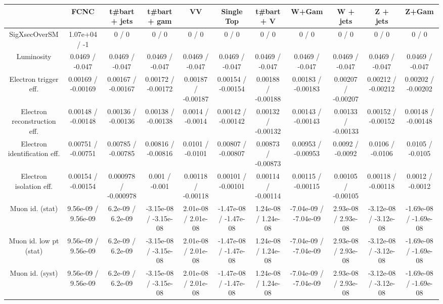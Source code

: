 \begin{table}[htbp]
\begin{center}
\footnotesize
\begin{tabular}{|c|c|c|c|c|c|c|c|c|c|c|}
\hline 
      & FCNC      & t#bar{t} + jets      & t#bar{t} +  gam      & VV      & Single Top      & t#bar{t} + V      & W+Gam      & W + jets      & Z + jets      & Z+Gam \\ 
\hline 
 SigXsecOverSM & 1.07e+04 / -1 & 0 / 0 & 0 / 0 & 0 / 0 & 0 / 0 & 0 / 0 & 0 / 0 & 0 / 0 & 0 / 0 & 0 / 0 \\ 
  Luminosity & 0.0469 / -0.047 & 0.0469 / -0.047 & 0.0469 / -0.047 & 0.0469 / -0.047 & 0.0469 / -0.047 & 0.0469 / -0.047 & 0.0469 / -0.047 & 0.0469 / -0.047 & 0.0469 / -0.047 & 0.0469 / -0.047 \\ 
  Electron trigger eff. & 0.00169 / -0.00169 & 0.00167 / -0.00167 & 0.00172 / -0.00172 & 0.00187 / -0.00187 & 0.00154 / -0.00154 & 0.00188 / -0.00188 & 0.00183 / -0.00183 & 0.00207 / -0.00207 & 0.00212 / -0.00212 & 0.00202 / -0.00202 \\ 
  Electron reconstruction eff. & 0.00148 / -0.00148 & 0.00136 / -0.00136 & 0.00138 / -0.00138 & 0.0014 / -0.0014 & 0.00142 / -0.00142 & 0.00132 / -0.00132 & 0.00143 / -0.00143 & 0.00133 / -0.00133 & 0.00152 / -0.00152 & 0.00148 / -0.00148 \\ 
  Electron identification eff. & 0.00751 / -0.00751 & 0.00785 / -0.00785 & 0.00816 / -0.00816 & 0.0101 / -0.0101 & 0.00807 / -0.00807 & 0.00873 / -0.00873 & 0.00953 / -0.00953 & 0.0092 / -0.0092 & 0.0106 / -0.0106 & 0.0105 / -0.0105 \\ 
  Electron isolation eff. & 0.00154 / -0.00154 & 0.000978 / -0.000978 & 0.001 / -0.001 & 0.00118 / -0.00118 & 0.00101 / -0.00101 & 0.00114 / -0.00114 & 0.00115 / -0.00115 & 0.00105 / -0.00105 & 0.00118 / -0.00118 & 0.0012 / -0.0012 \\ 
  Muon id. (stat) & 9.56e-09 / 9.56e-09 & 6.2e-09 / 6.2e-09 & -3.15e-08 / -3.15e-08 & 2.01e-08 / 2.01e-08 & -1.47e-08 / -1.47e-08 & 1.24e-08 / 1.24e-08 & -7.04e-09 / -7.04e-09 & 2.93e-08 / 2.93e-08 & -3.12e-08 / -3.12e-08 & -1.69e-08 / -1.69e-08 \\ 
  Muon id. low pt (stat) & 9.56e-09 / 9.56e-09 & 6.2e-09 / 6.2e-09 & -3.15e-08 / -3.15e-08 & 2.01e-08 / 2.01e-08 & -1.47e-08 / -1.47e-08 & 1.24e-08 / 1.24e-08 & -7.04e-09 / -7.04e-09 & 2.93e-08 / 2.93e-08 & -3.12e-08 / -3.12e-08 & -1.69e-08 / -1.69e-08 \\ 
  Muon id. (syst) & 9.56e-09 / 9.56e-09 & 6.2e-09 / 6.2e-09 & -3.15e-08 / -3.15e-08 & 2.01e-08 / 2.01e-08 & -1.47e-08 / -1.47e-08 & 1.24e-08 / 1.24e-08 & -7.04e-09 / -7.04e-09 & 2.93e-08 / 2.93e-08 & -3.12e-08 / -3.12e-08 & -1.69e-08 / -1.69e-08 \\ 

\end{tabular}
\end{center}
\end{table}
